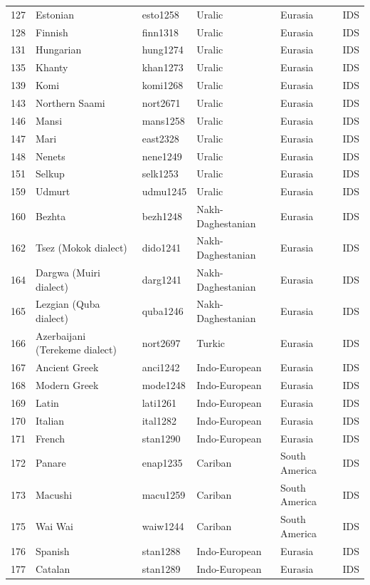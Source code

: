 \begin{table}[ht]
\begin{tabular}{rlllll}
  127 & Estonian & esto1258 & Uralic & Eurasia & IDS \\ 
  128 & Finnish & finn1318 & Uralic & Eurasia & IDS \\ 
  131 & Hungarian & hung1274 & Uralic & Eurasia & IDS \\ 
  135 & Khanty & khan1273 & Uralic & Eurasia & IDS \\ 
  139 & Komi & komi1268 & Uralic & Eurasia & IDS \\ 
  143 & Northern Saami & nort2671 & Uralic & Eurasia & IDS \\ 
  146 & Mansi & mans1258 & Uralic & Eurasia & IDS \\ 
  147 & Mari & east2328 & Uralic & Eurasia & IDS \\ 
  148 & Nenets & nene1249 & Uralic & Eurasia & IDS \\ 
  151 & Selkup & selk1253 & Uralic & Eurasia & IDS \\ 
  159 & Udmurt & udmu1245 & Uralic & Eurasia & IDS \\ 
  160 & Bezhta & bezh1248 & Nakh-Daghestanian & Eurasia & IDS \\ 
  162 & Tsez (Mokok dialect) & dido1241 & Nakh-Daghestanian & Eurasia & IDS \\ 
  164 & Dargwa (Muiri dialect) & darg1241 & Nakh-Daghestanian & Eurasia & IDS \\ 
  165 & Lezgian (Quba dialect) & quba1246 & Nakh-Daghestanian & Eurasia & IDS \\ 
  166 & Azerbaijani (Terekeme dialect) & nort2697 & Turkic & Eurasia & IDS \\ 
  167 & Ancient Greek & anci1242 & Indo-European & Eurasia & IDS \\ 
  168 & Modern Greek & mode1248 & Indo-European & Eurasia & IDS \\ 
  169 & Latin & lati1261 & Indo-European & Eurasia & IDS \\ 
  170 & Italian & ital1282 & Indo-European & Eurasia & IDS \\ 
  171 & French & stan1290 & Indo-European & Eurasia & IDS \\ 
  172 & Panare & enap1235 & Cariban & South America & IDS \\ 
  173 & Macushi & macu1259 & Cariban & South America & IDS \\ 
  175 & Wai Wai & waiw1244 & Cariban & South America & IDS \\ 
  176 & Spanish & stan1288 & Indo-European & Eurasia & IDS \\ 
  177 & Catalan & stan1289 & Indo-European & Eurasia & IDS \\ 

\end{tabular}
\end{table}
